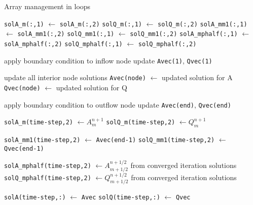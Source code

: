 \documentclass{article}
\begin{document}
\begin{algorithm}
\caption{Array management in loops}
\begin{algorithmic}[1]

	\State \verb+solA_m(:,1)+ $\gets$ \verb+solA_m(:,2)+
	\State \verb+solQ_m(:,1)+ $\gets$ \verb+solQ_m(:,2)+
	\State \verb+solA_mm1(:,1)+ $\gets$ \verb+solA_mm1(:,2)+
	\State \verb+solQ_mm1(:,1)+ $\gets$ \verb+solQ_mm1(:,2)+
	\State \verb+solA_mphalf(:,1)+ $\gets$ \verb+solA_mphalf(:,2)+
	\State \verb+solQ_mphalf(:,1)+ $\gets$ \verb+solQ_mphalf(:,2)+


		\State apply boundary condition to inflow node
		\State update \verb+Avec(1)+, \verb+Qvec(1)+


			\State update all interior node solutions
			\State \verb+Avec(node)+ $\gets$ updated solution for A
			\State \verb+Qvec(node)+ $\gets$ updated solution for Q

		\EndFor

		\State apply boundary condition to outflow node
		\State update \verb+Avec(end)+, \verb+Qvec(end)+
		
		\State \verb+solA_m(time-step,2)+ $\gets A_m^{n+1}$ 
		\State \verb+solQ_m(time-step,2)+ $\gets Q_m^{n+1}$ 
		
		\State \verb+solA_mm1(time-step,2)+ $\gets$ \verb+Avec(end-1)+ 
		\State \verb+solQ_mm1(time-step,2)+ $\gets$ \verb+Qvec(end-1)+ 
		 
		 \State \verb+solA_mphalf(time-step,2)+ $\gets A_{m+1/2}^{n+1/2}$ from converged iteration solutions
		 \State \verb+solQ_mphalf(time-step,2)+ $\gets Q_{m+1/2}^{n+1/2}$ from converged iteration solutions

	\EndFor
	
	\State \verb+solA(time-step,:)+ $\gets$ \verb+Avec+
	\State \verb+solQ(time-step,:)+ $\gets$ \verb+Qvec+

\EndFor
 \end{algorithmic}
 \end{algorithm}
 
 
\end{document}
